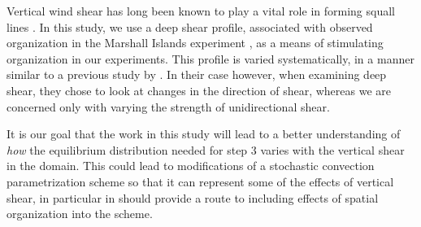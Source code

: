 \documentclass[11pt,a4paper]{article}
\newcommand\todo[1]{\textbf{TODO: #1}}
\begin{document}

Vertical wind shear has long been known to play a vital role in forming squall lines \parencite{TMM1982, RKW1988}. In this study, we use a deep shear profile, associated with observed organization in the Marshall Islands experiment \parencite{yanai1973determination}, as a means of stimulating organization in our experiments. This profile is varied systematically, in a manner similar to a previous study by \cite{RE2001}. In their case however, when examining deep shear, they chose to look at changes in the direction of shear, whereas we are concerned only with varying the strength of unidirectional shear.


It is our goal that the work in this study will lead to a better understanding of \textit{how} the equilibrium distribution needed for step 3 varies with the vertical shear in the domain. This could lead to modifications of a stochastic convection parametrization scheme so that it can represent some of the effects of vertical shear, in particular in should provide a route to including effects of spatial organization into the scheme. 

\end{document}

